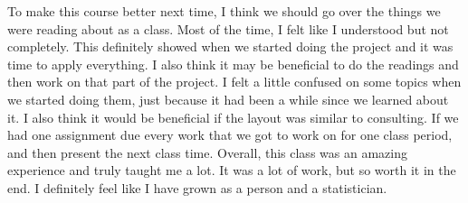 \documentclass[12pt, letterpaper]{article}
\begin{document}
To make this course better next time, I think we should go over the things we were reading about as a class. Most of the time, I felt like I understood but not completely. This definitely showed when we started doing the project and it was time to apply everything. I also think it may be beneficial to do the readings and then work on that part  of the project. I felt a little confused on some topics when we started doing them, just because it had been a while since we learned about it. I also think it would be beneficial if the layout was similar to consulting. If we had one assignment due every work that we got to work on for one class period, and then present the next class time. Overall, this class was an amazing experience and truly taught me a lot. It was a lot of work, but so worth it in the end. I definitely feel like I have grown as a person and a statistician.
\end{document}
